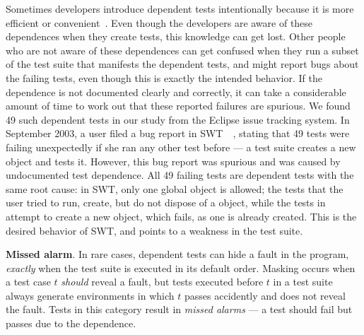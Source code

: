 Sometimes developers introduce dependent tests intentionally because it is
more efficient or convenient~\cite{kapfhammeretal:FSE:2003, whittakeretal:2012}.
Even though the developers are aware of these dependences
when they create tests, this knowledge can get lost.
Other people who are not aware of these dependences can get confused 
when they run a subset of the test suite that manifests the
dependent tests, and might report bugs about the failing tests,
even though this is exactly the intended behavior. 
If the dependence is not documented clearly and
correctly, it can take a considerable amount of time to work out that
these reported failures are spurious. We found
49 such dependent tests in our study from the Eclipse issue tracking system.
In September 2003, a user filed a
bug report in SWT~\cite{swt}~\cite{eclipsebug},
stating that 49 tests were failing unexpectedly
if she ran any other test before  --- 
a test suite creates a new  object and tests it.
However, this bug report was spurious and was
caused by undocumented test dependence.
All 49 failing tests are dependent tests with the same
root cause: in SWT, only one global 
object is allowed; the tests that the user tried to run,
create, but do not dispose of a  object, while
the tests in  attempt to create
a new  object, which fails, as one
is already created. This is the desired behavior of SWT,
and points to a weakness in the test suite.

\vspace{1mm}


\noindent \textbf{Missed alarm}. In rare cases,
dependent tests can hide a fault in the
program, \emph{exactly} when the test suite is executed in its default
order. Masking occurs when a test case $t$ \emph{should}
reveal a fault, but tests executed before $t$ in a test suite always
generate environments in which $t$ passes accidently and
does not reveal the fault. 
Tests in this category result in \textit{missed alarms} ---
a test should fail but passes due to the dependence.



